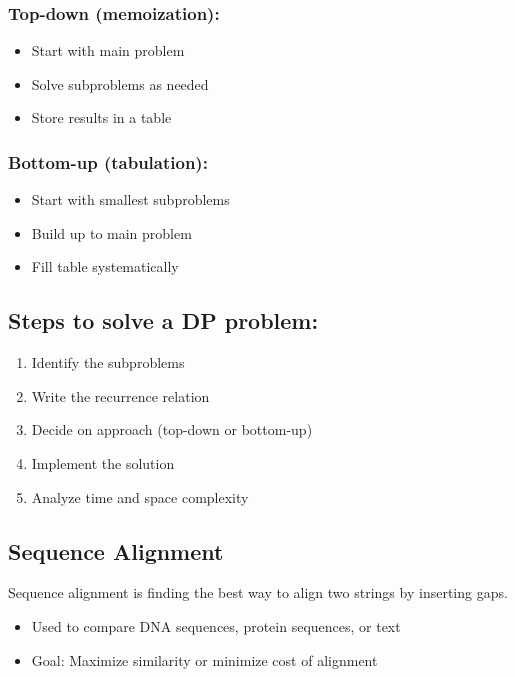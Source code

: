 \documentclass[11pt,a4paper]{article}
\begin{document}
\begin{multicols}{2}
\subsubsection{Top-down (memoization):}
\begin{itemize}
    \item Start with main problem
    \item Solve subproblems as needed
    \item Store results in a table
\end{itemize}

\subsubsection{Bottom-up (tabulation):}
\begin{itemize}
    \item Start with smallest subproblems
    \item Build up to main problem
    \item Fill table systematically
\end{itemize}

\subsection{Steps to solve a DP problem:}
\begin{enumerate}
    \item Identify the subproblems
    \item Write the recurrence relation
    \item Decide on approach (top-down or bottom-up)
    \item Implement the solution
    \item Analyze time and space complexity
\end{enumerate}

\subsection{Sequence Alignment}
Sequence alignment is finding the best way to align two strings by inserting gaps.
\begin{itemize}
    \item Used to compare DNA sequences, protein sequences, or text
    \item Goal: Maximize similarity or minimize cost of alignment
\end{itemize}

\end{multicols}
\end{document}
